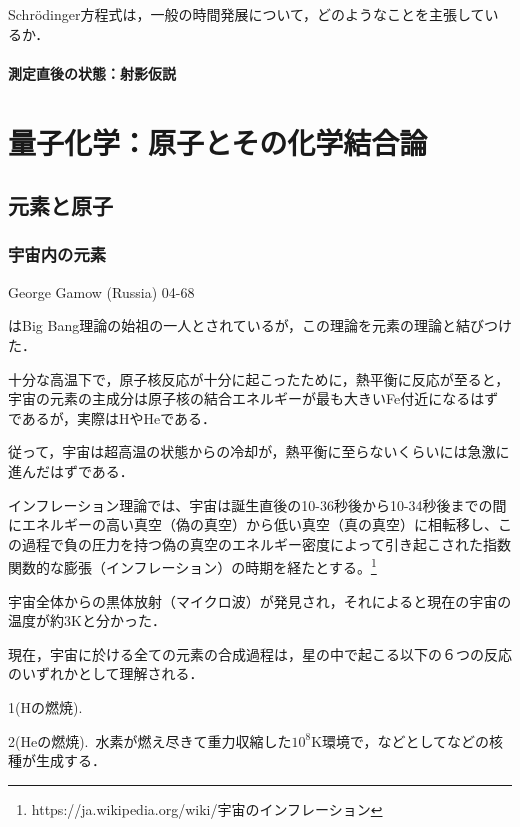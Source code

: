 \documentclass[uplatex, dvipdfmx]{jsreport}
\begin{document}
Schrödinger方程式は，一般の時間発展について，どのようなことを主張しているか．

\subsection{測定直後の状態：射影仮説}

\part{量子化学：原子とその化学結合論}

\chapter{元素と原子}
\section{宇宙内の元素}
George Gamow (Russia) 04-68

はBig Bang理論の始祖の一人とされているが，この理論を元素の理論と結びつけた．
\begin{hypothesis}[Gamowのinflation理論]\rm{}
    十分な高温下で，原子核反応が十分に起こったために，熱平衡に反応が至ると，宇宙の元素の主成分は原子核の結合エネルギーが最も大きいFe付近になるはずであるが，実際はHやHeである．

    従って，宇宙は超高温の状態からの冷却が，熱平衡に至らないくらいには急激に進んだはずである．
\end{hypothesis}
\begin{theory}
    インフレーション理論では、宇宙は誕生直後の10-36秒後から10-34秒後までの間にエネルギーの高い真空（偽の真空）から低い真空（真の真空）に相転移し、この過程で負の圧力を持つ偽の真空のエネルギー密度によって引き起こされた指数関数的な膨張（インフレーション）の時期を経たとする。\footnote{https://ja.wikipedia.org/wiki/宇宙のインフレーション}
\end{theory}
\begin{fact}[1965]
    宇宙全体からの黒体放射（マイクロ波）が発見され，それによると現在の宇宙の温度が約$3\si{\kelvin}$と分かった．
\end{fact}
\begin{hypothesis}
    現在，宇宙に於ける全ての元素の合成過程は，星の中で起こる以下の６つの反応のいずれかとして理解される．\rm{}

    1(Hの燃焼).\, 

    2(Heの燃焼).\, 水素が燃え尽きて重力収縮した$10^8\si{\kelvin}$環境で，などとしてなどの核種が生成する．
\end{hypothesis}
\end{document}
